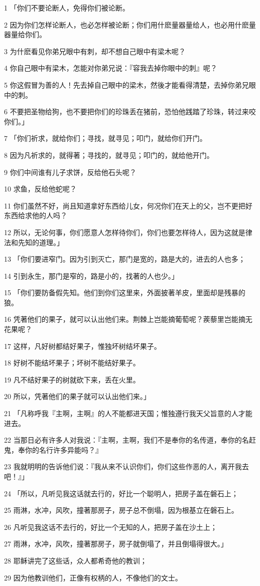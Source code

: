 \par 1 「你们不要论断人，免得你们被论断。
\par 2 因为你们怎样论断人，也必怎样被论断；你们用什麽量器量给人，也必用什麽量器量给你们。
\par 3 为什麽看见你弟兄眼中有刺，却不想自己眼中有梁木呢？
\par 4 你自己眼中有梁木，怎能对你弟兄说：『容我去掉你眼中的刺』呢？
\par 5 你这假冒为善的人！先去掉自己眼中的梁木，然後才能看得清楚，去掉你弟兄眼中的刺。
\par 6 不要把圣物给狗，也不要把你们的珍珠丢在猪前，恐怕他践踏了珍珠，转过来咬你们。」
\par 7 「你们祈求，就给你们；寻找，就寻见；叩门，就给你们开门。
\par 8 因为凡祈求的，就得著；寻找的，就寻见；叩门的，就给他开门。
\par 9 你们中间谁有儿子求饼，反给他石头呢？
\par 10 求鱼，反给他蛇呢？
\par 11 你们虽然不好，尚且知道拿好东西给儿女，何况你们在天上的父，岂不更把好东西给求他的人吗？
\par 12 所以，无论何事，你们愿意人怎样待你们，你们也要怎样待人，因为这就是律法和先知的道理。」
\par 13 「你们要进窄门。因为引到灭亡，那门是宽的，路是大的，进去的人也多；
\par 14 引到永生，那门是窄的，路是小的，找著的人也少。」
\par 15 「你们要防备假先知。他们到你们这里来，外面披著羊皮，里面却是残暴的狼。
\par 16 凭著他们的果子，就可以认出他们来。荆棘上岂能摘葡萄呢？蒺藜里岂能摘无花果呢？
\par 17 这样，凡好树都结好果子，惟独坏树结坏果子。
\par 18 好树不能结坏果子；坏树不能结好果子。
\par 19 凡不结好果子的树就砍下来，丢在火里。
\par 20 所以，凭著他们的果子就可以认出他们来。」
\par 21 「凡称呼我『主啊，主啊』的人不能都进天国；惟独遵行我天父旨意的人才能进去。
\par 22 当那日必有许多人对我说：『主啊，主啊，我们不是奉你的名传道，奉你的名赶鬼，奉你的名行许多异能吗？』
\par 23 我就明明的告诉他们说：『我从来不认识你们，你们这些作恶的人，离开我去吧！』」
\par 24 「所以，凡听见我这话就去行的，好比一个聪明人，把房子盖在磐石上；
\par 25 雨淋，水冲，风吹，撞著那房子，房子总不倒塌，因为根基立在磐石上。
\par 26 凡听见我这话不去行的，好比一个无知的人，把房子盖在沙土上；
\par 27 雨淋，水冲，风吹，撞著那房子，房子就倒塌了，并且倒塌得很大。」
\par 28 耶稣讲完了这些话，众人都希奇他的教训；
\par 29 因为他教训他们，正像有权柄的人，不像他们的文士。


